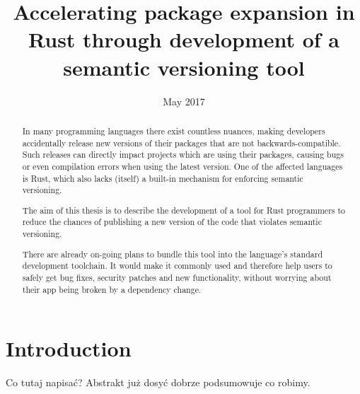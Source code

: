 \documentclass[licencjacka,en]{pracamgr}
\title{Accelerating package expansion in Rust through development of a semantic versioning tool}
\date{May 2017}
\begin{document}
\maketitle

\begin{abstract}
In many programming languages there exist countless nuances, 
making developers accidentally release new versions of their packages 
that are not backwards-compatible. 
Such releases can directly impact projects which are using their packages, 
causing bugs or even compilation errors when using the latest version. 
One of the affected languages is Rust, 
which also lacks (itself) a built-in mechanism for enforcing semantic versioning.

The aim of this thesis is to describe the development of a tool 
for Rust programmers to reduce the chances of publishing 
a new version of the code that violates semantic versioning.

There are already on-going plans to bundle this tool 
into the language's standard development toolchain. 
It would make it commonly used and therefore help users to safely get bug fixes, 
security patches and new functionality, 
without worrying about their app being broken by a dependency change. 
\end{abstract}

\tableofcontents

\chapter*{Introduction}

Co tutaj napisać? Abstrakt już dosyć dobrze podsumowuje co robimy.



\end{document}
